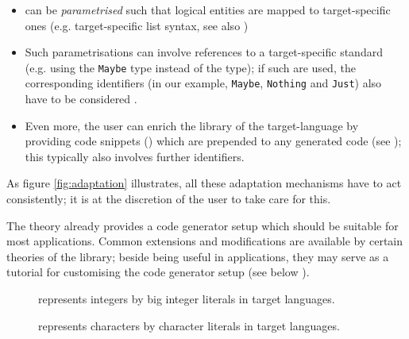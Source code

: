 \begin{isabellebody}
\begin{isamarkuptext}
\begin{itemize}
    \item {} can be \emph{parametrised} such that
      logical entities are mapped to target-specific ones
      (e.g. target-specific list syntax, see also
      )

    \item Such parametrisations can involve references to a
      target-specific standard  (e.g. using the  \verb|Maybe| type instead of the 
       type); if such are used, the corresponding
      identifiers (in our example, \verb|Maybe|, \verb|Nothing| and \verb|Just|) also have to be considered .

    \item Even more, the user can enrich the library of the
      target-language by providing code snippets () which are prepended to any generated code (see
      ); this typically also involves further
       identifiers.

  \end{itemize}

  \noindent As figure \ref{fig:adaptation} illustrates, all these
  adaptation mechanisms have to act consistently; it is at the
  discretion of the user to take care for this.%
\end{isamarkuptext}%
\isamarkuptrue%
%
\isamarkuptrue%
%
\begin{isamarkuptext}%
The \hyperlink{theory.HOL}{\mbox{}} \hyperlink{theory.Main}{\mbox{}} theory already provides a code
  generator setup which should be suitable for most applications.
  Common extensions and modifications are available by certain
  theories of the  library; beside being useful in
  applications, they may serve as a tutorial for customising the code
  generator setup (see below ).

  \begin{description}

    \item[\hyperlink{theory.Code-Integer}{\mbox{}}] represents  integers by
       big integer literals in target languages.

    \item[\hyperlink{theory.Code-Char}{\mbox{}}] represents  characters by
       character literals in target languages.


\end{description}
\end{isamarkuptext}
\end{isabellebody}
